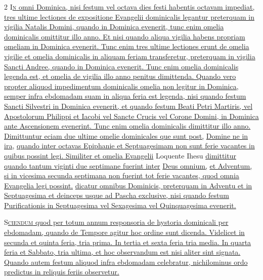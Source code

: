 \begin{multicols*}{2}
{\color{Red} }
\lettrine[lines=2]{\zallmancaps \color{Red} I}{}\ul{\textsc{n} omni Dominica, nisi festum vel octava dies festi habentis octavam impediat, tres ultime lectiones de expositione Evangelii dominicalis legantur preterquam in vigilia Natalis Domini, quando in Dominica evenerit, tunc enim omelia dominicalis omittitur illo anno. Et nisi quando aliqua vigilia habens propriam omeliam in Dominica evenerit. Tunc enim tres ultime lectiones erunt de omelia vigilie et omelia dominicalis in aliquam feriam transferetur, preterquam in vigilia Sancti Andree, quando in Dominica evenerit. Tunc enim omelia dominicalis legenda est, et omelia de vigilia illo anno penitus dimittenda. Quando vero propter aliquod impedimentum dominicalis omelia non legitur in Dominica, semper infra ebdomadam suam in aliqua feria est legenda, nisi quando festum Sancti Silvestri in Dominica evenerit, et quando festum Beati Petri Martiris, vel Apostolorum Philippi et Iacobi vel Sancte Crucis vel Corone Domini, in Dominica ante Ascensionem evenerint. Tunc enim omelia dominicalis dimittitur illo anno. Dimittuntur eciam due ultime omelie dominicales que sunt post,} \hyperlink{domine-ne-in-ira}{Domine ne in ira}, \ul{quando inter octavas Epiphanie et Septuagesimam non sunt ferie vacantes in quibus possint legi. Similiter et omelia Evangelii} Loquente Ihesu \ul{dimittitur quando tantum viginti due septimane fuerint inter} \hyperlink{deus-omnium}{Deus omnium,} \ul{et Adventum, si in vicesima secunda septimana non fuerint tot ferie vacantes, quod omnia Evangelia legi possint.}
\newline {} \ul{dicatur omnibus Dominicis, preterquam in Adventu et in Septuagesima et deinceps usque ad Pascha exclusive, nisi quando festum Purificationis in Septuagesima vel Sexagesima vel Quinquagesima evenerit.}

{\color{Red} }
\lettrine[lines=2]{\zallmancaps \color{Blue} S}{}\ul{\textsc{ciendum} quod per totum annum responsoria de hystoria dominicali per ebdomadam, quando de Tempore agitur hoc ordine sunt dicenda. Videlicet in secunda et quinta feria, tria prima. In tertia et sexta feria tria media. In quarta feria et Sabbato, tria ultima, et hoc observandum est nisi aliter sint signata. Quando autem festum aliquod infra ebdomadam celebratur, nichilominus ordo predictus in reliquis feriis observetur.}


\end{multicols*}
